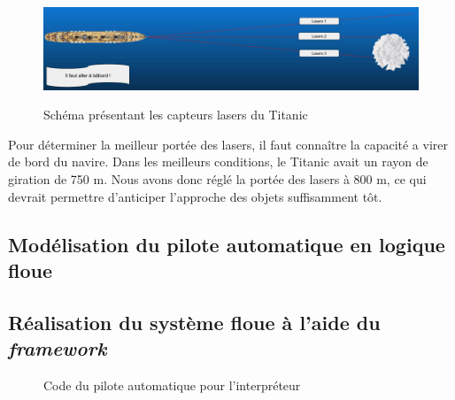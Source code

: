 \documentclass[a4paper,11pt]{article}
\begin{document}
    \begin{figure}[h!]
        \begin{center}
            \caption{Schéma présentant les capteurs lasers du Titanic}
            \includegraphics[scale=0.26]{assets/Lasers_Illustration.jpg}
            \label{fig:titanicLasers}
        \end{center}
    \end{figure}

    Pour déterminer la meilleur portée des lasers, il faut connaître la capacité a virer de bord du navire. Dans les meilleurs conditions, le Titanic avait un rayon de giration de 750 m. Nous avons donc réglé la portée des lasers à 800 m, ce qui devrait permettre d’anticiper l’approche des objets suffisamment tôt.

    \subsection{Modélisation du pilote automatique en logique floue}

    \subsection{Réalisation du système floue à l'aide du \textit{framework}}

    \begin{figure}[h!]
        \begin{center}
            \caption{Code du pilote automatique pour l’interpréteur}
            
            \label{fig:codeAutoPilot}
        \end{center}
    \end{figure}
\end{document}
